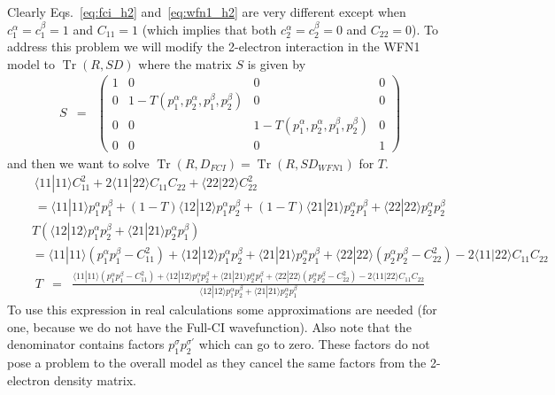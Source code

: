 \documentclass[pra]{revtex4-1}
\DeclareMathOperator{\tr}{Tr}
\begin{document}
Clearly Eqs.~\ref{eq:fci_h2} and~\ref{eq:wfn1_h2} are very different except when 
$c_1^\alpha = c_1^\beta = 1$ and $C_{11} = 1$
(which implies that both $c_2^\alpha = c_2^\beta = 0$ and $C_{22} = 0$). To address this problem we 
will modify the 2-electron interaction in the WFN1 model to $\tr(R,SD)$ where the matrix $S$ is given by
\begin{eqnarray}
   S &=& 
   \begin{pmatrix}
   1            & 0                & 0                & 0            \\
   0            & 1-T(p_1^\alpha,p_2^\alpha,p_1^\beta,p_2^\beta) & 0                & 0            \\
   0            & 0                & 1-T(p_1^\alpha,p_2^\alpha,p_1^\beta,p_2^\beta) & 0            \\
   0            & 0                & 0                & 1          
   \end{pmatrix}
   \label{eq:wfn1_t}
\end{eqnarray}
and then we want to solve $\tr(R,D_{FCI})=\tr(R,SD_{WFN1})$ for $T$.
\begin{eqnarray}
  &&\langle 11|11 \rangle C_{11}^2 + 2 \langle 11|22 \rangle C_{11}C_{22} + \langle 22|22 \rangle C_{22}^2
    \nonumber \\
  &&= \langle 11|11 \rangle p_1^\alpha p_1^\beta + (1-T)\langle 12|12 \rangle p_1^\alpha p_2^\beta
    +  (1-T)\langle 21|21 \rangle p_2^\alpha p_1^\beta + \langle 22|22 \rangle p_2^\alpha p_2^\beta 
\end{eqnarray}
\begin{eqnarray}
  &&T\left(\langle 12|12 \rangle p_1^\alpha p_2^\beta+
           \langle 21|21 \rangle p_2^\alpha p_1^\beta\right) \nonumber \\
  &&=  \langle 11|11 \rangle \left(p_1^\alpha p_1^\beta-C_{11}^2\right)
    +  \langle 12|12 \rangle p_1^\alpha p_2^\beta
    +  \langle 21|21 \rangle p_2^\alpha p_1^\beta
    +  \langle 22|22 \rangle \left(p_2^\alpha p_2^\beta-C_{22}^2\right)
    - 2 \langle 11|22 \rangle C_{11}C_{22} 
\end{eqnarray}
\begin{eqnarray}
  T &=& \frac{
             \langle 11|11 \rangle \left(p_1^\alpha p_1^\beta-C_{11}^2\right)
         +   \langle 12|12 \rangle p_1^\alpha p_2^\beta
         +   \langle 21|21 \rangle p_2^\alpha p_1^\beta
         +   \langle 22|22 \rangle \left(p_2^\alpha p_2^\beta-C_{22}^2\right)
         - 2 \langle 11|22 \rangle C_{11}C_{22}
        }{
         \langle 12|12 \rangle p_1^\alpha p_2^\beta+\langle 21|21 \rangle p_2^\alpha p_1^\beta
        }
\end{eqnarray}
To use this expression in real calculations some approximations are needed
(for one, because we do not have the Full-CI wavefunction). Also note
that the denominator contains factors $p_1^\sigma p_2^{\sigma'}$ which can go to zero.
These factors do not pose a problem to the overall model as they cancel the
same factors from the 2-electron density matrix. 
\end{document}
